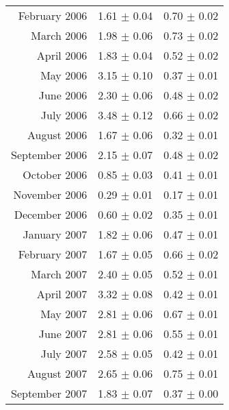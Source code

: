 \documentclass[a4paper,12pt]{article}
\begin{document}
\begin{center}
\begin{longtable}{|r|c|c|}
    February	2006	&	1.61	$\pm$	0.04	&	0.70	$\pm$	0.02	\\
    March	2006	&	1.98	$\pm$	0.06	&	0.73	$\pm$	0.02	\\
    April	2006	&	1.83	$\pm$	0.04	&	0.52	$\pm$	0.02	\\
    May		2006	&	3.15	$\pm$	0.10	&	0.37	$\pm$	0.01	\\
    June	2006	&	2.30	$\pm$	0.06	&	0.48	$\pm$	0.02	\\
    July	2006	&	3.48	$\pm$	0.12	&	0.66	$\pm$	0.02	\\
    August	2006	&	1.67	$\pm$	0.06	&	0.32	$\pm$	0.01	\\
    September	2006	&	2.15	$\pm$	0.07	&	0.48	$\pm$	0.02	\\
    October	2006	&	0.85	$\pm$	0.03	&	0.41	$\pm$	0.01	\\
    November	2006	&	0.29	$\pm$	0.01	&	0.17	$\pm$	0.01	\\
    December	2006	&	0.60	$\pm$	0.02	&	0.35	$\pm$	0.01	\\
    January	2007	&	1.82	$\pm$	0.06	&	0.47	$\pm$	0.01	\\
    February	2007	&	1.67	$\pm$	0.05	&	0.66	$\pm$	0.02	\\
    March	2007	&	2.40	$\pm$	0.05	&	0.52	$\pm$	0.01	\\
    April	2007	&	3.32	$\pm$	0.08	&	0.42	$\pm$	0.01	\\
    May		2007	&	2.81	$\pm$	0.06	&	0.67	$\pm$	0.01	\\
    June	2007	&	2.81	$\pm$	0.06	&	0.55	$\pm$	0.01	\\
    July	2007	&	2.58	$\pm$	0.05	&	0.42	$\pm$	0.01	\\
    August	2007	&	2.65	$\pm$	0.06	&	0.75	$\pm$	0.01	\\
    September	2007	&	1.83	$\pm$	0.07	&	0.37	$\pm$	0.00	\\

  \end{longtable}
\end{center}
\end{document}
